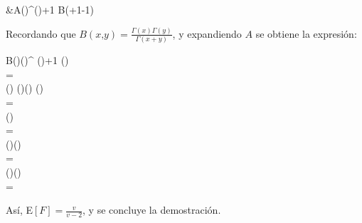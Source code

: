 \begin{Demo}
\begin{enumerate}
\begin{longderivation}
      &A\left(\right)^{()+1}
      B\left(+1\text{,}-1\right)\\
    \end{longderivation}
    Recordando que $B(x\text{,}y)=\displaystyle\frac{\Gamma(x)\Gamma(y)}
    {\Gamma(x+y)}$, y expandiendo $A$ se obtiene la expresión:
    \begin{longderivation}
      {B\left(\text{,}\right)}\left(\right)^
      {()+1}
      {\Gamma\left(\right)}\\
      =\\
      \left(\right)
      {\Gamma\left(\right)\Gamma\left(\right)}
      {\Gamma\left(\right)}\\
      =\\
      \left(\right)\\
      =\\
      \left(\right)\left(\right)
      \\
      =\\
      \left(\right)\left(\right)\\
      =\\
    \end{longderivation}
    Así, E$[F]=\displaystyle\frac{v}{v-2}$, y se concluye la demostración.
  \end{enumerate}
\end{Demo}

